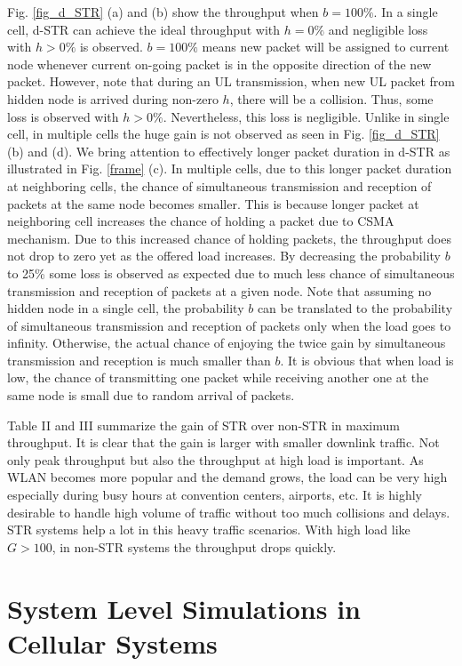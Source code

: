 \documentclass[twocolumn]{IEEEtran}
\begin{document}
Fig. \ref{fig_d_STR} (a) and (b) show the throughput when $b=100\%$.
In a single cell, d-STR can achieve the ideal throughput with
$h=0\%$ and negligible loss with $h>0\%$ is observed. $b=100\%$
means new packet will be assigned to current node whenever current
on-going packet is in the opposite direction of the new packet.
However, note that during an UL transmission, when new UL packet
from hidden node is arrived during non-zero $h$, there will be a
collision. Thus, some loss is observed with $h>0\%$. Nevertheless,
this loss is negligible. Unlike in single cell, in multiple cells
the huge gain is not observed as seen in Fig. \ref{fig_d_STR} (b)
and (d). We bring attention to effectively longer packet duration in
d-STR as illustrated in Fig. \ref{frame} (c). In multiple cells, due
to this longer packet duration at neighboring cells, the chance of
simultaneous transmission and reception of packets at the same node
becomes smaller. This is because longer packet at neighboring cell
increases the chance of holding a packet due to CSMA mechanism. Due
to this increased chance of holding packets, the throughput does not
drop to zero yet as the offered load increases. By decreasing the
probability $b$ to 25\% some loss is observed as expected due to
much less chance of simultaneous transmission and reception of
packets at a given node. Note that assuming no hidden node in a
single cell, the probability $b$ can be translated to the
probability of simultaneous transmission and reception of packets
only when the load goes to infinity. Otherwise, the actual chance of
enjoying the twice gain by simultaneous transmission and reception
is much smaller than $b$. It is obvious that when load is low, the
chance of transmitting one packet while receiving another one at the
same node is small due to random arrival of packets.

Table II and III summarize the gain of STR over non-STR in maximum
throughput. It is clear that the gain is larger with smaller
downlink traffic. Not only peak throughput but also the throughput
at high load is important. As WLAN becomes more popular and the
demand grows, the load can be very high especially during busy hours
at convention centers, airports, etc. It is highly desirable to
handle high volume of traffic without too much collisions and
delays. STR systems help a lot in this heavy traffic scenarios. With
high load like $G>100$, in non-STR systems the throughput drops
quickly.



\section{System Level Simulations in Cellular Systems}
\end{document}
